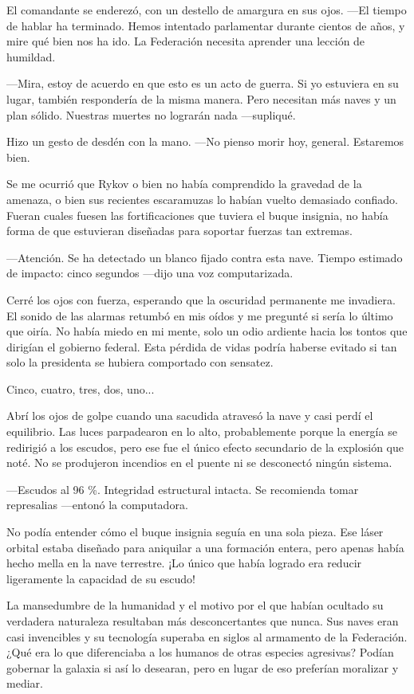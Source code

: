 El comandante se enderezó, con un destello de amargura en sus ojos. —El tiempo de hablar ha terminado. Hemos intentado parlamentar durante cientos de años, y mire qué bien nos ha ido. La Federación necesita aprender una lección de humildad.

—Mira, estoy de acuerdo en que esto es un acto de guerra. Si yo estuviera en su lugar, también respondería de la misma manera. Pero necesitan más naves y un plan sólido. Nuestras muertes no lograrán nada —supliqué.

Hizo un gesto de desdén con la mano. —No pienso morir hoy, general. Estaremos bien.

Se me ocurrió que Rykov o bien no había comprendido la gravedad de la amenaza, o bien sus recientes escaramuzas lo habían vuelto demasiado confiado. Fueran cuales fuesen las fortificaciones que tuviera el buque insignia, no había forma de que estuvieran diseñadas para soportar fuerzas tan extremas.

—Atención. Se ha detectado un blanco fijado contra esta nave. Tiempo estimado de impacto: cinco segundos —dijo una voz computarizada.

Cerré los ojos con fuerza, esperando que la oscuridad permanente me invadiera. El sonido de las alarmas retumbó en mis oídos y me pregunté si sería lo último que oiría. No había miedo en mi mente, solo un odio ardiente hacia los tontos que dirigían el gobierno federal. Esta pérdida de vidas podría haberse evitado si tan solo la presidenta se hubiera comportado con sensatez.

Cinco, cuatro, tres, dos, uno...

Abrí los ojos de golpe cuando una sacudida atravesó la nave y casi perdí el equilibrio. Las luces parpadearon en lo alto, probablemente porque la energía se redirigió a los escudos, pero ese fue el único efecto secundario de la explosión que noté. No se produjeron incendios en el puente ni se desconectó ningún sistema.

—Escudos al 96 \%. Integridad estructural intacta. Se recomienda tomar represalias —entonó la computadora.

No podía entender cómo el buque insignia seguía en una sola pieza. Ese láser orbital estaba diseñado para aniquilar a una formación entera, pero apenas había hecho mella en la nave terrestre. ¡Lo único que había logrado era reducir ligeramente la capacidad de su escudo!

La mansedumbre de la humanidad y el motivo por el que habían ocultado su verdadera naturaleza resultaban más desconcertantes que nunca. Sus naves eran casi invencibles y su tecnología superaba en siglos al armamento de la Federación. ¿Qué era lo que diferenciaba a los humanos de otras especies agresivas? Podían gobernar la galaxia si así lo desearan, pero en lugar de eso preferían moralizar y mediar.

